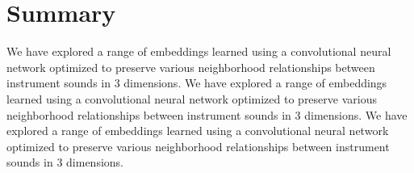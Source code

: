 \documentclass{article}
\begin{document}
\section{Summary}

We have explored a range of embeddings learned using a convolutional neural network optimized to preserve various neighborhood relationships between instrument sounds in 3 dimensions.
We have explored a range of embeddings learned using a convolutional neural network optimized to preserve various neighborhood relationships between instrument sounds in 3 dimensions.
We have explored a range of embeddings learned using a convolutional neural network optimized to preserve various neighborhood relationships between instrument sounds in 3 dimensions.








\end{document}
